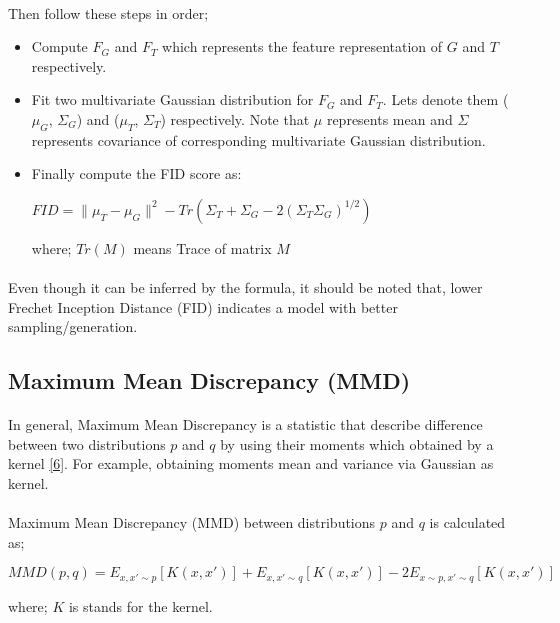 \documentclass{article}
\begin{document}
    \paragraph{}
    Then follow these steps in order;
    \begin{itemize}
        \item Compute $F_G$ and $F_T$ which represents the feature representation of $G$ and $T$ respectively.
        \item Fit two multivariate Gaussian distribution for $F_G$ and $F_T$. Lets denote them ($\mu_G$, $\Sigma_G$) and ($\mu_T$, $\Sigma_T$) respectively. Note that $\mu$ represents mean and $\Sigma$ represents covariance of corresponding multivariate Gaussian distribution.
        \item Finally compute the FID score as:
        \begin{center}
            $FID = \|\mu_T - \mu_G\|^2 - Tr(\Sigma_T + \Sigma_G - 2(\Sigma_T\Sigma_G)^{1/2})$ 
        \end{center}
        where; $Tr(M)$ means Trace of matrix $M$
    \end{itemize}
    \paragraph{}
    Even though it can be inferred by the formula, it should be noted that, lower Frechet Inception Distance (FID) indicates a model with better sampling/generation.
    \subsection{Maximum Mean Discrepancy (MMD)}
    \paragraph{}
    In general, Maximum Mean Discrepancy is a statistic that describe difference between two distributions $p$ and $q$ by using their moments which obtained by a kernel \hyperref[sec: ref6]{[6]}. For example, obtaining moments mean and variance via Gaussian as kernel.

    \paragraph{}
    Maximum Mean Discrepancy (MMD) between distributions $p$ and $q$ is calculated as;
    \begin{center}
        $MMD(p, q) = E_{x, x'\sim p}[K(x, x')] + E_{x, x'\sim q}[K(x, x')] - 2 E_{x\sim p, x'\sim q}[K(x, x')]$
    \end{center}
    where; $K$ is stands for the kernel.
\end{document}
